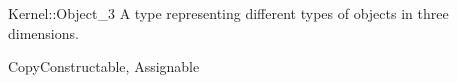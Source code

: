 \begin{ccRefConcept}{Kernel::Object_3}
A type representing different types of objects in three dimensions.

\ccRefines
CopyConstructable, Assignable 

\ccSeeAlso
{} \\
 \\
 \\
 \\

\end{ccRefConcept}
